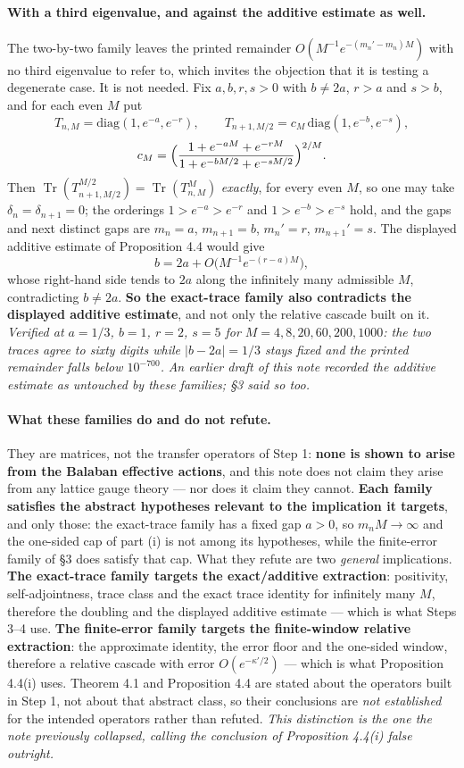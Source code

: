 \documentclass[11pt]{article}
\begin{document}
\paragraph{With a third eigenvalue, and against the additive estimate as well.} The
two-by-two family leaves the printed remainder $O(M^{-1}e^{-(m_n'-m_n)M})$ with no
third eigenvalue to refer to, which invites the objection that it is testing a
degenerate case. It is not needed. Fix $a,b,r,s>0$ with $b\neq2a$, $r>a$ and $s>b$,
and for each even $M$ put
\[
T_{n,M}=\mathrm{diag}(1,e^{-a},e^{-r}),\qquad
T_{n+1,M/2}=c_M\,\mathrm{diag}(1,e^{-b},e^{-s}),
\]
\[
c_M=\Bigl(\frac{1+e^{-aM}+e^{-rM}}{1+e^{-bM/2}+e^{-sM/2}}\Bigr)^{2/M}.
\]
Then $\operatorname{Tr}(T_{n+1,M/2}^{M/2})=\operatorname{Tr}(T_{n,M}^{M})$
\emph{exactly}, for every even $M$, so one may take $\delta_n=\delta_{n+1}=0$; the
orderings $1>e^{-a}>e^{-r}$ and $1>e^{-b}>e^{-s}$ hold, and the gaps and next distinct
gaps are $m_n=a$, $m_{n+1}=b$, $m_n'=r$, $m_{n+1}'=s$. The displayed additive estimate
of Proposition 4.4 would give
\[
b=2a+O\bigl(M^{-1}e^{-(r-a)M}\bigr),
\]
whose right-hand side tends to $2a$ along the infinitely many admissible $M$,
contradicting $b\neq2a$. \textbf{So the exact-trace family also contradicts the
displayed additive estimate}, and not only the relative cascade built on it.
\emph{Verified at $a=1/3$, $b=1$, $r=2$, $s=5$ for $M=4,8,20,60,200,1000$: the two
traces agree to sixty digits while $|b-2a|=1/3$ stays fixed and the printed remainder
falls below $10^{-700}$.} \emph{An earlier draft of this note recorded the additive
estimate as untouched by these families; \S3 said so too.}

\paragraph{What these families do and do not refute.} They are matrices, not the
transfer operators of Step 1: \textbf{none is shown to arise from the Balaban effective
actions}, and this note does not claim they arise from any lattice gauge theory --- nor
does it claim they cannot. \textbf{Each family satisfies the abstract hypotheses
relevant to the implication it targets}, and only those: the exact-trace family has a
fixed gap $a>0$, so $m_nM\to\infty$ and the one-sided cap of part (i) is not among its
hypotheses, while the finite-error family of \S3 does satisfy that cap. What they refute are two \emph{general} implications.
\textbf{The exact-trace family targets the exact/additive extraction}: positivity,
self-adjointness, trace class and the exact trace identity for infinitely many $M$,
therefore the doubling and the displayed additive estimate --- which is what Steps
3--4 use. \textbf{The finite-error family targets the
\mbox{finite-window} relative extraction}: the approximate identity, the error floor and the one-sided window,
therefore a relative cascade with error $O(e^{-\kappa'/2})$ --- which is what
Proposition 4.4(i) uses. Theorem 4.1 and Proposition 4.4 are stated about the
operators built in Step 1, not about that abstract class, so their conclusions are
\emph{not established} for the intended operators rather than refuted. \emph{This
distinction is the one the note previously collapsed, calling the conclusion of
Proposition 4.4(i) false outright.}
\end{document}
